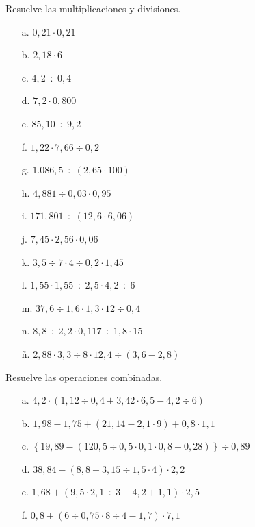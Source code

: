 \documentclass[spanish,letterpaper, 11pt, addpoints, answers]{exam}
\begin{document}
\begin{questions}
\begin{multicols}{2}
      \end{multicols}

      \question Resuelve las multiplicaciones y divisiones.
      \begin{multicols}{2}
        \begin{itemize}
          \item[a.] $0,21\cdot 0,21$
          \item[b.] $2,18\cdot 6$
          \item[c.] $4,2\div 0,4$
          \item[d.] $7,2\cdot 0,800$
          \item[e.] $85,10\div 9,2$
          \item[f.] $1,22\cdot 7,66\div 0,2$
          \item[g.] $1.086,5\div (2,65\cdot 100)$
          \item[h.] $4,881\div 0,03\cdot 0,95$
          \item[i.] $171,801\div (12,6\cdot 6,06)$
          \item[j.] $7,45\cdot 2,56\cdot 0,06$
          \item[k.] $3,5\div 7\cdot 4\div 0,2\cdot 1,45$
          \item[l.] $1,55\cdot 1,55\div 2,5\cdot 4,2\div 6$
          \item[m.] $37,6\div 1,6\cdot 1,3\cdot 12\div 0,4$
          \item[n.] $8,8\div 2,2\cdot 0,117\div 1,8\cdot 15$
          \item[ñ.] $2,88\cdot 3,3\div 8\cdot 12,4\div (3,6-2,8)$       
        \end{itemize}
        
      \end{multicols}

      \question Resuelve las operaciones combinadas.
      
        \begin{itemize}
          \item[a.] $4,2\cdot (1,12\div 0,4+3,42\cdot 6,5-4,2\div 6)$
          \item[b.] $1,98-1,75+(21,14-2,1\cdot 9)+0,8\cdot 1,1$
          \item[c.] $\left\{19,89-(120,5\div 0,5\cdot 0,1\cdot 0,8-0,28)\right\}\div 0,89$
          \item[d.] $38,84-(8,8+3,15\div 1,5\cdot 4)\cdot 2,2$
          \item[e.] $1,68+(9,5\cdot 2,1\div 3-4,2+1,1)\cdot 2,5$
          \item[f.] $0,8+(6\div 0,75\cdot 8\div 4-1,7)\cdot 7,1$
                

\end{itemize}
\end{questions}
\end{document}
